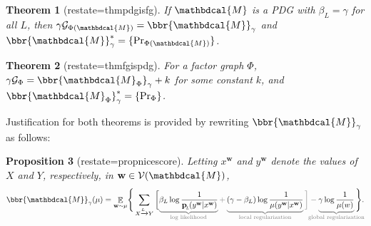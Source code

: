 \documentclass{article}
\theoremstyle{plain}
\newtheorem{theorem}{Theorem}[section]
\newtheorem{prop}[theorem]{Proposition}
\theoremstyle{definition}
\theoremstyle{remark}
\newcommand{\thickD}{I\mkern-8muD}
\newcommand{\kldiv}{\thickD\infdivx}
\DeclareMathOperator*{\E}{\mathbb{E}} %
\newcommand\mat[1]{\mathbf{#1}}
\newcommand{\bp}[1][L]{\mat{p}_{\!_{#1}\!}}
\newcommand{\V}{\mathcal V}
\newcommand{\dg}[1]{\mathbdcal{#1}}
\newcommand{\PDGof}[1]{{\dg M}_{#1}}
\numberwithin{equation}{section}
\begin{document}
\begin{theorem}[restate=thmpdgisfg]\label{thm:pdg-is-fg}
If $\dg M$ is a PDG with $\beta_L = \gamma$ for all 
 $L$, then
$\gamma \mathcal G_{\Phi(\dg M)} = \bbr{\dg M}_{\gamma}$ and
$\bbr{\dg M}_{\gamma}^* = \{\Pr_{\Phi({\dg M})} \}$.
\end{theorem}
\begin{theorem}[restate=thmfgispdg]\label{thm:fg-is-pdg}
For a factor graph $\Phi$,
	$\gamma \mathcal G_\Phi = \bbr{\PDGof{\Phi}}_{\gamma} + k$        
for some constant $k$, and 
        $\bbr{\PDGof{\Phi}}_{\gamma}^* = \{\Pr_{\Phi} \}$. 
\end{theorem}
Justification for both theorems is provided by rewriting
$\bbr{\dg M}_\gamma$ as follows: 
\begin{prop}[restate=propnicescore] \label{prop:nice-score}
 Letting $x^{\mat w}$ and $y^{\mat w}$ denote the values of
  $X$ and $Y$, respectively, in $\mat w \in \V(\dg M)$, 
\begin{equation}\label{eq:semantics-breakdown}
\bbr{\dg M}_\gamma(\mu) = \E_{\mat w \sim \mu}\! \Bigg\{ \sum_{ X \xrightarrow{\!\!L} Y  }
\bigg[\!
    \color{gray}\underbrace{\color{black}
      \beta_L \log \frac{1}{\bp(y^{\mat w} |x^{\mat w})}
	}_{\color{gray}\smash{\text{log likelihood}}} + \underbrace{\color{black}
(\gamma - \beta_L ) \log \frac{1}{\mu(y^{\mat w} |x^{\mat w})} 
	}_{\color{gray}\smash{\mathclap{\text{local regularization}}}}\bigg] - \underbrace{\color{black}
    \gamma \log \frac{1}{\mu(w)}
	}_{\color{gray}\smash{\mathclap{\text{global
        regularization}}}}\color{black}\Bigg\} .
\end{equation}
\end{prop}
\end{document}
